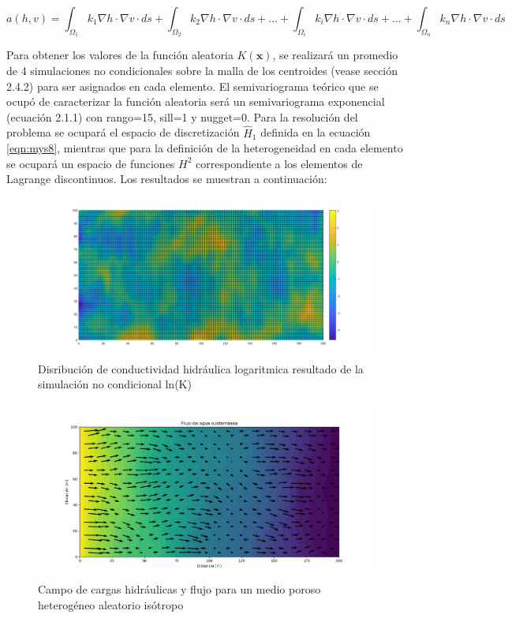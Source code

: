 \begin{equation}
 \label{eqn:mys22}
 a(h,v)=\int_{\Omega_{1}}^{} k_{1}{\nabla}h{\cdot}{\nabla}v \cdot ds+\int_{\Omega_{2}}^{} k_{2}{\nabla}h{\cdot}{\nabla}v \cdot ds+...+\int_{\Omega_{i}}^{} k_{i}{\nabla}h{\cdot}{\nabla}v \cdot ds+...+\int_{\Omega_{n}}^{} k_{n}{\nabla}h{\cdot}{\nabla}v \cdot ds
\end{equation}

Para obtener los valores de la función aleatoria $K(\textbf{x})$, se realizará un promedio de 4 simulaciones no condicionales sobre la malla de los centroides (vease sección 2.4.2) para ser asignados en cada elemento. El semivariograma teórico que se ocupó de caracterizar la función aleatoria será un semivariograma exponencial (ecuación 2.1.1) con rango=15, sill=1 y nugget=0. Para la resolución del problema se ocupará el espacio de discretización $\hat{H}_{1}$ definida en la ecuación \ref{eqn:mys8}, mientras que para la definición de la heterogeneidad en cada elemento se ocupará un espacio de funciones $H^{2}$ correspondiente a los elementos de Lagrange discontinuos. Los resultados se muestran a continuación:

\newpage


\begin{figure}[H]
\centering
\includegraphics[scale=0.45]{Figura_37.1.png}
\caption{ Disribución de conductividad hidráulica logaritmica resultado de la simulación no condicional ln(K)}
\label{Figura3:9.1}
\end{figure}

 \begin{figure}[H]
\centering
\includegraphics[scale=0.50]{Figure_37.png}
\caption{ Campo de cargas hidráulicas y flujo para un medio poroso heterogéneo aleatorio isótropo}
\label{Figura3:9}
\end{figure}

